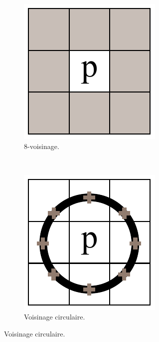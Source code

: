 \begin{itemize}
\begin{figure}[htb]
\begin{subfigure}[t]{0.2\textwidth}
			\includegraphics[width=\textwidth]{images/etat-de-l-art/8V}
		 \caption{8-voisinage.}
			\label{fig:sota::vois8}
	\end{subfigure}
	~
	 \begin{subfigure}[t]{0.2\textwidth}	
			\includegraphics[width=\textwidth]{images/etat-de-l-art/CV}
		 \caption{Voisinage circulaire.}
			\label{fig:sota::voisC}
			

\end{subfigure}
\end{figure}
\end{itemize}
